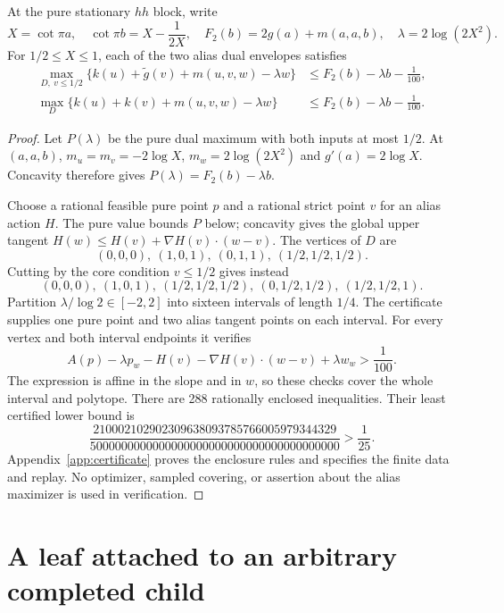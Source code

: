 \begin{lemma}\label{lem:two-leaf-gap}
At the pure stationary $hh$ block, write
\[
 X=\cot\pi a,\quad \cot\pi b=X-\frac1{2X},\quad
 F_2(b)=2g(a)+m(a,a,b),\quad \lambda=2\log(2X^2).
\]
For $1/2\le X\le1$, each of the two alias dual envelopes satisfies
\begin{align}
 \max_{D,\ v\le1/2}\{k(u)+\widetilde g(v)+m(u,v,w)-\lambda w\}
 &\le F_2(b)-\lambda b-\frac1{100},\label{eq:AC-gap}\\
 \max_D\{k(u)+k(v)+m(u,v,w)-\lambda w\}
 &\le F_2(b)-\lambda b-\frac1{100}.\label{eq:AA-gap}
\end{align}
\end{lemma}
\begin{proof}
Let $P(\lambda)$ be the pure dual maximum with both inputs at most $1/2$. At $(a,a,b)$, $m_u=m_v=-2\log X$, $m_w=2\log(2X^2)$ and $g'(a)=2\log X$. Concavity therefore gives $P(\lambda)=F_2(b)-\lambda b$.

Choose a rational feasible pure point $p$ and a rational strict point $v$ for an alias action $H$. The pure value bounds $P$ below; concavity gives the global upper tangent $H(w)\le H(v)+\nabla H(v)\cdot(w-v)$. The vertices of $D$ are
\[
 (0,0,0),\ (1,0,1),\ (0,1,1),\ (1/2,1/2,1/2).
\]
Cutting by the core condition $v\le1/2$ gives instead
\[
 (0,0,0),\ (1,0,1),\ (1/2,1/2,1/2),\
 (0,1/2,1/2),\ (1/2,1/2,1).
\]
Partition $\lambda/\log2\in[-2,2]$ into sixteen intervals of length $1/4$. The certificate supplies one pure point and two alias tangent points on each interval. For every vertex and both interval endpoints it verifies
\[
 A(p)-\lambda p_w-H(v)-\nabla H(v)\cdot(w-v)+\lambda w_w>\frac1{100}.
\]
The expression is affine in the slope and in $w$, so these checks cover the whole interval and polytope. There are 288 rationally enclosed inequalities. Their least certified lower bound is
\[
 \frac{210002102902309638093785766005979344329}
 {5000000000000000000000000000000000000000}>\frac1{25}.
\]
Appendix~\ref{app:certificate} proves the enclosure rules and specifies the finite data and replay. No optimizer, sampled covering, or assertion about the alias maximizer is used in verification.
\end{proof}

\section{A leaf attached to an arbitrary completed child}

